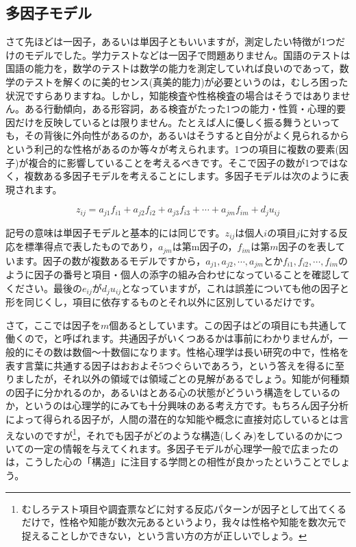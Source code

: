 \documentclass{ltjsbook}
\begin{document}
\subsection{多因子モデル}
さて先ほどは一因子，あるいは単因子ともいいますが，測定したい特徴が1つだけのモデルでした。学力テストなどは一因子で問題ありません。国語のテストは国語の能力を，数学のテストは数学の能力を測定していれば良いのであって，数学のテストを解くのに美的センス(真美的能力)が必要というのは，むしろ困った状況ですらありますね。しかし，知能検査や性格検査の場合はそうではありません。ある行動傾向，ある形容詞，ある検査がたった1つの能力・性質・心理的要因だけを反映しているとは限りません。たとえば人に優しく振る舞うといっても，その背後に外向性があるのか，あるいはそうすると自分がよく見られるからという利己的な性格があるのか等々が考えられます。1つの項目に複数の要素(因子)が複合的に影響していることを考えるべきです。そこで因子の数が1つではなく，複数ある多因子モデルを考えることにします。多因子モデルは次のように表現されます。

\begin{equation}
	z_{ij} = a_{j1}f_{i1} + a_{j2}f_{i2}+a_{j3}f_{i3} + \cdots + a_{jm}f_{im} + d_j u_{ij}
	\label{factor}
\end{equation}

記号の意味は単因子モデルと基本的には同じです。$z_{ij}$は個人$i$の項目$j$に対する反応を標準得点で表したものであり，$a_{jm}$は第m因子の，$f_{im}$は第$m$因子のを表しています。因子の数が複数あるモデルですから，$a_{j1},a_{j2},\cdots, a_{jm}$とか$f_{i1},f_{i2},\cdots, f_{im}$のように因子の番号と項目・個人の添字の組み合わせになっていることを確認してください。最後の$e_{ij}$が$d_j u_{ij}$となっていますが，これは誤差についても他の因子と形を同じくし，項目に依存するものとそれ以外に区別しているだけです。

さて，ここでは因子を$m$個あるとしています。この因子はどの項目にも共通して働くので，と呼ばれます。共通因子がいくつあるかは事前にわかりませんが，一般的にその数は数個〜十数個になります。性格心理学は長い研究の中で，性格を表す言葉に共通する因子はおおよそ5つぐらいであろう，という答えを得るに至りましたが，それ以外の領域では領域ごとの見解があるでしょう。知能が何種類の因子に分かれるのか，あるいはとある心の状態がどういう構造をしているのか，というのは心理学的にみても十分興味のある考え方です。もちろん因子分析によって得られる因子が，人間の潜在的な知能や概念に直接対応しているとは言えないのですが\footnote{むしろテスト項目や調査票などに対する反応パターンが因子として出てくるだけで，性格や知能が数次元あるというより，我々は性格や知能を数次元で捉えることしかできない，という言い方の方が正しいでしょう。}，それでも因子がどのような構造(しくみ)をしているのかについての一定の情報を与えてくれます。多因子モデルが心理学一般で広まったのは，こうした心の「構造」に注目する学問との相性が良かったということでしょう。
\end{document}
